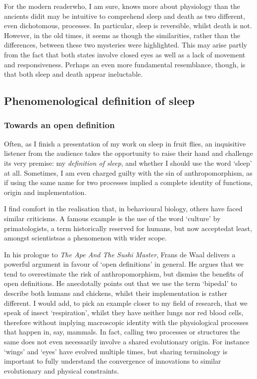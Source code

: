 For the modern reader\emd{}who, I am sure, knows more about physiology than the ancients did\emd{}it may be intuitive to comprehend sleep and death as two different, even dichotomous, processes.
In particular, sleep is reversible, whilst death is not.
However, in the old times, it seems as though the similarities, rather than the differences, between these two mysteries were highlighted.
This may arise partly from the fact that both states involve closed eyes as well as a lack of movement and responsiveness.
Perhaps an even more fundamental resemblance, though, is that both sleep and death appear ineluctable.

\subsection{Phenomenological definition of sleep}	
\subsubsection{Towards an open definition}

Often, as I finish a presentation of my work on sleep in fruit flies, an inquisitive listener from the audience
takes the opportunity to raise their hand and challenge its very premise: my \emph{definition of sleep},
and whether I should use the word `sleep' at all.
Sometimes, I am even charged guilty with the sin of anthropomorphism, 
as if using the same name for two processes implied a complete identity of functions, origin and implementation.

I find comfort in the realisation that, in behavioural biology, others have faced similar criticisms.
A famous example is the use of the word `culture' by primatologists, a term historically reserved for humans, 
but now accepted\emd{}at least, amongst scientists\emd{}as a phenomenon with wider scope\cite{laland_question_2009,whiten_scope_2011}.

In his prologue to \emph{The Ape And The Sushi Master}, Frans de Waal  delivers a powerful argument in favour of `open definitions' in general\cite{waal_ape_2001}.
He argues that we tend to overestimate the risk of anthropomorphism, but dismiss the benefits of open definitions.
He anecdotally points out that we use the term `bipedal' to describe both humans and chickens, whilst their implementation is rather different.
I would add, to pick an example closer to my field of research, that we speak of insect `respiration', whilst they have neither lungs nor red blood cells\cite{slama_new_1988,nation_insect_2008}, therefore without implying macroscopic identity with the physiological processes that happen in, say, mammals.
In fact, calling two processes or structures the same does not even necessarily involve a shared evolutionary origin.
For instance `wings' and `eyes' have evolved multiple times\cite{land_evolution_1992,stern_genetic_2013}, but sharing terminology is important to fully understand the convergence of innovations to similar evolutionary and physical constraints.

